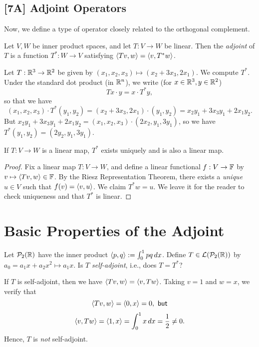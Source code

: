 \documentclass{article}
\begin{document}
\subsection*{[7A] Adjoint Operators}
Now, we define a type of operator closely related to the orthogonal complement.
\begin{definition}
Let $V,W$ be inner product spaces, and let $T: V\to W$ be linear. Then the \textit{adjoint} of $T$ is a function $T^*: W\to V$ satisfying $\left\langle Tv, w\right\rangle = \left\langle v, T^*w\right\rangle$.
\end{definition}
\begin{example}
Let $T: \mathbb R^3\to \mathbb R^2$ be given by $(x_1, x_2, x_3) \mapsto (x_2+3x_3, 2x_1)$. We compute $T^*$. Under the standard dot product (in $\mathbb R^n$), we write (for $x\in\mathbb R^3, y\in \mathbb R^2$)
$$Tx\cdot y = x\cdot T^*y,$$
so that we have
$$(x_1, x_2, x_3) \cdot T^*(y_1, y_2) = (x_2 + 3x_3, 2x_1) \cdot (y_1, y_2) = x_2y_1 + 3x_3y_1 + 2x_1 y_2.$$
But $x_2y_1+3x_3y_1+2x_1y_2 = (x_1, x_2, x_3)\cdot (2x_2, y_1, 3y_1)$, so we have $T^*(y_1, y_2) = (2y_2, y_1, 3y_1)$.
\end{example}
\begin{lemma}
If $T: V\to W$ is a linear map, $T^*$ exists uniquely and is also a linear map.
\end{lemma}
\begin{proof}
Fix a linear map $T: V\to W$, and define a linear functional $f: V\to \mathbb F$ by $v\mapsto \left\langle Tv, w\right\rangle\in \mathbb F$. By the Riesz Representation Theorem, there exists a \textit{unique} $u\in V$ such that $f(v) = \left\langle v, u\right\rangle$. We claim $T^*w = u$. We leave it for the reader to check uniqueness and that $T^*$ is linear.
\end{proof}

\section{Basic Properties of the Adjoint}
\begin{example}
Let $\mathcal P_2(\mathbb R)$ have the inner product $\left\langle p, q\right\rangle := \int_0^1 pq\, dx$. Define $T\in \mathcal L(\mathcal P_2(\mathbb R))$ by $a_0 = a_1x + a_2x^2 \mapsto a_1x$. Is $T$ \textit{self-adjoint}, i.e., does $T = T^*$?
\end{example}
\begin{solution}
If $T$ is self-adjoint, then we have $\left\langle Tv, w\right\rangle = \left\langle v, Tw\right\rangle$. Taking $v= 1$ and $w=x$, we verify that
$$\left\langle Tv, w\right\rangle = \left\langle0, x\right\rangle = 0, \textsf{ but}$$
$$\left\langle v, Tw\right\rangle = \left\langle1, x\right\rangle = \int_0^1 x\, dx = \frac 12\neq 0.$$
Hence, $T$ is \textit{not} self-adjoint.
\end{solution}
\newpage
\end{document}
